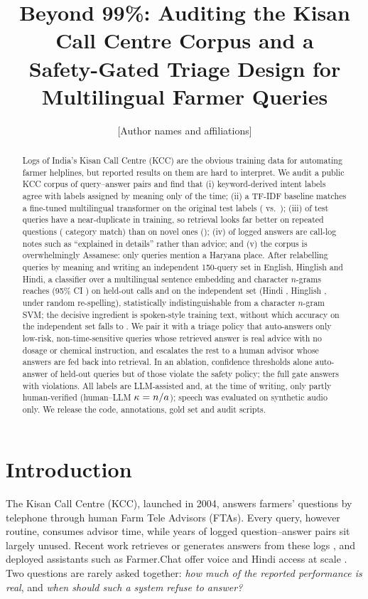 \documentclass[11pt]{article}
\title{Beyond 99\%: Auditing the Kisan Call Centre Corpus and a\\Safety-Gated Triage Design for Multilingual Farmer Queries}
\author{[Author names and affiliations]}
\date{}
\begin{document}
\maketitle

\begin{abstract}
Logs of India's Kisan Call Centre (KCC) are the obvious training data for automating farmer helplines, but reported results on them are hard to interpret.
We audit a public KCC corpus of \corpusRows{} query--answer pairs and find that (i) keyword-derived intent labels agree with labels assigned by meaning only \kwAgree{} of the time; (ii) a TF-IDF baseline matches a fine-tuned multilingual transformer on the original test labels (\tfidfOldTest{} vs.\ \bertOldTest{}); (iii) \nearDup{} of test queries have a near-duplicate in training, so retrieval looks far better on repeated questions (\retNearDup{} category match) than on novel ones (\retNovel{}); (iv) \callLogShare{} of logged answers are call-log notes such as ``explained in details'' rather than advice; and (v) the corpus is overwhelmingly Assamese: only \haryanaMentions{} queries mention a Haryana place.
After relabelling \annN{} queries by meaning and writing an independent 150-query set in English, Hinglish and Hindi, a classifier over a multilingual sentence embedding and character $n$-grams reaches \silverAcc{} (95\% CI \silverAccCI{}) on held-out calls and \goldAcc{} on the independent set (Hindi \goldHi{}, Hinglish \goldHing{}, \hingPert{} under random re-spelling), statistically indistinguishable from a character $n$-gram SVM; the decisive ingredient is spoken-style training text, without which accuracy on the independent set falls to \noAugGold{}.
We pair it with a triage policy that auto-answers only low-risk, non-time-sensitive queries whose retrieved answer is real advice with no dosage or chemical instruction, and escalates the rest to a human advisor whose answers are fed back into retrieval.
In an ablation, confidence thresholds alone auto-answer \covThrOnly{} of held-out queries but \violThrOnly{} of those violate the safety policy; the full gate answers \covFull{} with \violFull{} violations.
All labels are LLM-assisted and, at the time of writing, only partly human-verified (human--LLM $\kappa=n/a{}$); speech was evaluated on synthetic audio only.
We release the code, annotations, gold set and audit scripts.
\end{abstract}

\section{Introduction}
The Kisan Call Centre (KCC), launched in 2004, answers farmers' questions by telephone through human Farm Tele Advisors (FTAs). Every query, however routine, consumes advisor time, while years of logged question--answer pairs sit largely unused. Recent work retrieves or generates answers from these logs \cite{kisanqrs,agrillm}, and deployed assistants such as Farmer.Chat offer voice and Hindi access at scale \cite{farmerchat}. Two questions are rarely asked together: \emph{how much of the reported performance is real}, and \emph{when should such a system refuse to answer?}
\end{document}
